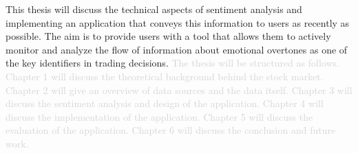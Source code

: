 
This thesis will discuss the technical aspects of sentiment analysis and implementing an application that conveys this information to users as recently as possible. The aim is to provide users with a tool that allows them to actively monitor and analyze the flow of information about emotional overtones as one of the key identifiers in trading decisions. \textcolor{lightgray}{The thesis will be structured as follows. Chapter 1 will discuss the theoretical background behind the stock market. Chapter 2 will give an overview of data sources and the data itself. Chapter 3 will discuss the sentiment analysis and design of the application. Chapter 4 will discuss the implementation of the application. Chapter 5 will discuss the evaluation of the application. Chapter 6 will discuss the conclusion and future work.}

